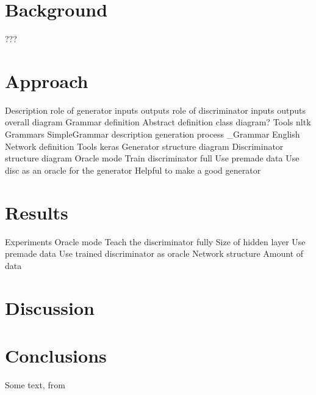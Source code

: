 \documentclass[12pt]{article}
\begin{document}
\section{Background}
    ???

\section{Approach}
    Description
        role of generator
            inputs
            outputs
        role of discriminator
            inputs
            outputs
        overall diagram
    Grammar definition
        Abstract definition
            class diagram?
        Tools
            nltk
        Grammars
            SimpleGrammar
                description
                generation process
            \_Grammar
            English
    Network definition
        Tools
            keras
        Generator structure
            diagram
        Discriminator structure
            diagram
    Oracle mode
        Train discriminator full
        Use premade data
        Use disc as an oracle for the generator
        Helpful to make a good generator

\section{Results}
    Experiments
        Oracle mode
            Teach the discriminator fully
                Size of hidden layer
            Use premade data
            Use trained discriminator as oracle
        Network structure
        Amount of data

\section{Discussion}
\blindtext

\section{Conclusions}


Some text, from \cite{chollet2015keras}

{}

\end{document}
